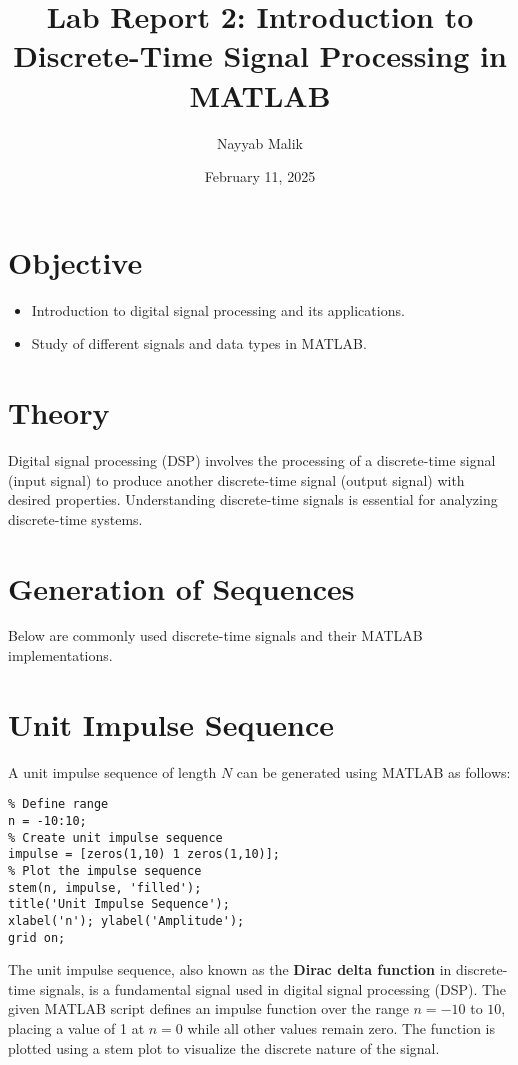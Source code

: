\documentclass[a4paper,12pt]{article}
\title{\textbf{Lab Report 2: Introduction to Discrete-Time Signal Processing in MATLAB}}
\author{Nayyab Malik}
\date{February 11, 2025}
\begin{document}
\maketitle
\tableofcontents
\newpage

\section{Objective}
\begin{itemize}
    \item Introduction to digital signal processing and its applications.
    \item Study of different signals and data types in MATLAB.
\end{itemize}

\section{Theory}
Digital signal processing (DSP) involves the processing of a discrete-time signal (input signal) to produce another discrete-time signal (output signal) with desired properties. Understanding discrete-time signals is essential for analyzing discrete-time systems.

\section{Generation of Sequences}
Below are commonly used discrete-time signals and their MATLAB implementations.


\section{Unit Impulse Sequence}
A unit impulse sequence of length \(N\) can be generated using MATLAB as follows:

\begin{verbatim}
% Define range
n = -10:10; 
% Create unit impulse sequence
impulse = [zeros(1,10) 1 zeros(1,10)];
% Plot the impulse sequence
stem(n, impulse, 'filled');
title('Unit Impulse Sequence');
xlabel('n'); ylabel('Amplitude');
grid on;
\end{verbatim}
The unit impulse sequence, also known as the \textbf{Dirac delta function} in discrete-time signals, is a fundamental signal used in digital signal processing (DSP). The given MATLAB script defines an impulse function over the range \( n = -10 \) to \( 10 \), placing a value of 1 at \( n = 0 \) while all other values remain zero. The function is plotted using a stem plot to visualize the discrete nature of the signal. 
\end{document}
